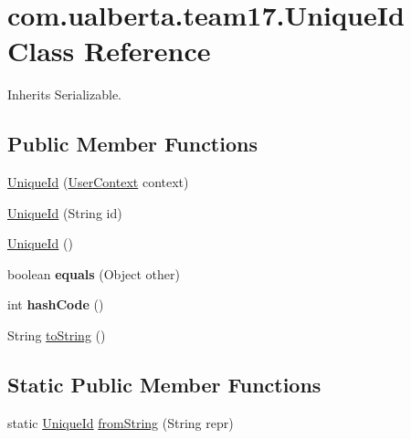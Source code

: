 \hypertarget{classcom_1_1ualberta_1_1team17_1_1_unique_id}{\section{com.\+ualberta.\+team17.\+Unique\+Id Class Reference}
\label{classcom_1_1ualberta_1_1team17_1_1_unique_id}
}


Inherits Serializable.

\subsection*{Public Member Functions}
\begin{DoxyCompactItemize}
\item 
\hyperlink{classcom_1_1ualberta_1_1team17_1_1_unique_id_a0bfa055b011aefabbd763846bae460d0}{Unique\+Id} (\hyperlink{classcom_1_1ualberta_1_1team17_1_1datamanager_1_1_user_context}{User\+Context} context)
\item 
\hyperlink{classcom_1_1ualberta_1_1team17_1_1_unique_id_a183e1ee5f112616c444f8cc20f937661}{Unique\+Id} (String id)
\item 
\hyperlink{classcom_1_1ualberta_1_1team17_1_1_unique_id_a20a84f4917010481b9e8646303fc58d9}{Unique\+Id} ()
\item 
\hypertarget{classcom_1_1ualberta_1_1team17_1_1_unique_id_a3c2187a78ca7a94e1724e436ee4a4a92}{boolean {\bfseries equals} (Object other)}\label{classcom_1_1ualberta_1_1team17_1_1_unique_id_a3c2187a78ca7a94e1724e436ee4a4a92}

\item 
\hypertarget{classcom_1_1ualberta_1_1team17_1_1_unique_id_a02be487765a56c3a96791da37652f4a9}{int {\bfseries hash\+Code} ()}\label{classcom_1_1ualberta_1_1team17_1_1_unique_id_a02be487765a56c3a96791da37652f4a9}

\item 
String \hyperlink{classcom_1_1ualberta_1_1team17_1_1_unique_id_a3193ac7fdbd964964355a1682cd1cd44}{to\+String} ()
\end{DoxyCompactItemize}
\subsection*{Static Public Member Functions}
\begin{DoxyCompactItemize}
\item 
static \hyperlink{classcom_1_1ualberta_1_1team17_1_1_unique_id}{Unique\+Id} \hyperlink{classcom_1_1ualberta_1_1team17_1_1_unique_id_a0eeff7b94e632a3688b8ec7f271cf3a8}{from\+String} (String repr)
\end{DoxyCompactItemize}
